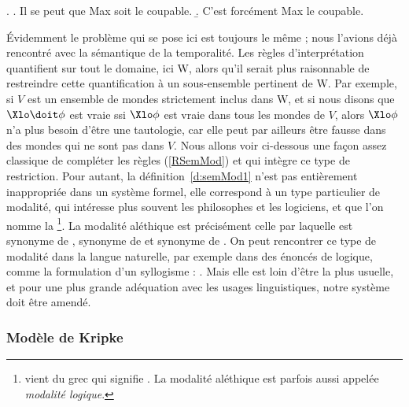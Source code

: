 \ex.
\a. Il se peut que Max soit le coupable.
\b. C'est forcément Max le coupable.


Évidemment le problème qui se pose ici est toujours le même ; nous l'avions déjà rencontré avec la sémantique de la temporalité. Les règles d'interprétation quantifient sur tout le domaine, ici \Unv W, alors qu'il serait plus raisonnable de restreindre cette quantification à un sous-ensemble pertinent de \Unv W.
Par exemple, si $V$ est un ensemble de mondes strictement inclus dans \Unv W, et si nous disons que $\Xlo\doit\phi$ est vraie ssi $\Xlo\phi$ est vraie dans tous les mondes de $V$, alors $\Xlo\phi$ n'a plus besoin d'être une tautologie, car elle peut par ailleurs être fausse dans des mondes qui ne sont pas dans $V$.
Nous allons voir ci-dessous une façon assez classique de compléter les règles 
(\RSem\ref{RSemMod}) et qui intègre ce type de restriction. 
Pour autant, la définition~\ref{d:semMod1} n'est pas entièrement inappropriée dans un système formel, elle correspond à un type particulier de modalité, qui intéresse plus souvent les philosophes et les logiciens, et que l'on nomme la \footnote{ vient du grec  qui signifie . La modalité aléthique est parfois aussi appelée \emph{modalité logique}.}.
La modalité aléthique est précisément celle par laquelle  est synonyme de ,  synonyme de  et  synonyme de . On peut rencontrer ce type de modalité dans la langue naturelle, par exemple dans des énoncés de logique, comme la formulation d'un syllogisme : . 
Mais elle est loin d'être la plus usuelle, et pour une plus grande adéquation avec les usages linguistiques, notre système doit être amendé.





\subsubsection{Modèle de Kripke} 
\label{sss:MKripke}

